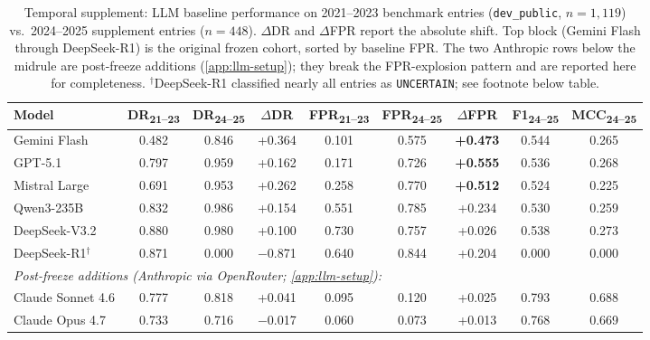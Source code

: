 \begin{table}[t]
\centering
\caption{Temporal supplement: LLM baseline performance on 2021--2023 benchmark entries (\texttt{dev\_public}, $n{=}1{,}119$) vs.\ 2024--2025 supplement entries ($n{=}448$). $\Delta$DR and $\Delta$FPR report the absolute shift. Top block (Gemini Flash through DeepSeek-R1) is the original frozen cohort, sorted by baseline FPR. The two Anthropic rows below the midrule are post-freeze additions (\cref{app:llm-setup}); they break the FPR-explosion pattern and are reported here for completeness. $^\dagger$DeepSeek-R1 classified nearly all entries as \texttt{UNCERTAIN}; see footnote below table.}
\label{tab:temporal_supplement}
\small
\setlength{\tabcolsep}{3pt}
\begin{tabular}{lcccccccc}
\toprule
\textbf{Model} & \textbf{DR\textsubscript{21--23}} & \textbf{DR\textsubscript{24--25}} & \textbf{$\Delta$DR} & \textbf{FPR\textsubscript{21--23}} & \textbf{FPR\textsubscript{24--25}} & \textbf{$\Delta$FPR} & \textbf{F1\textsubscript{24--25}} & \textbf{MCC\textsubscript{24--25}} \\
\midrule
Gemini Flash       & 0.482 & 0.846 & +0.364 & 0.101 & 0.575 & \textbf{+0.473} & 0.544 & 0.265 \\
GPT-5.1            & 0.797 & 0.959 & +0.162 & 0.171 & 0.726 & \textbf{+0.555} & 0.536 & 0.268 \\
Mistral Large      & 0.691 & 0.953 & +0.262 & 0.258 & 0.770 & \textbf{+0.512} & 0.524 & 0.225 \\
Qwen3-235B         & 0.832 & 0.986 & +0.154 & 0.551 & 0.785 & +0.234 & 0.530 & 0.259 \\
DeepSeek-V3.2      & 0.880 & 0.980 & +0.100 & 0.730 & 0.757 & +0.026 & 0.538 & 0.273 \\
DeepSeek-R1$^\dagger$ & 0.871 & 0.000 & $-$0.871 & 0.640 & 0.844 & +0.204 & 0.000 & 0.000 \\
\midrule
\multicolumn{9}{l}{\emph{Post-freeze additions (Anthropic via OpenRouter; \cref{app:llm-setup}):}} \\
Claude Sonnet 4.6     & 0.777 & 0.818 & +0.041 & 0.095 & 0.120 & +0.025 & 0.793 & 0.688 \\
Claude Opus 4.7       & 0.733 & 0.716 & $-$0.017 & 0.060 & 0.073 & +0.013 & 0.768 & 0.669 \\
\bottomrule
\end{tabular}
\end{table}


